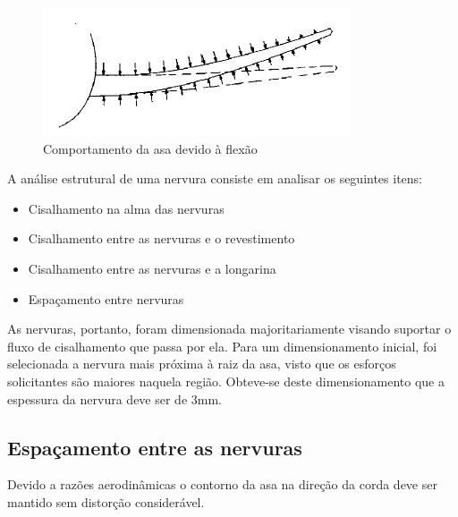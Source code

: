 \begin{figure}
\centering
\includegraphics[width=\textwidth]{images/parte4/nervura2}
\caption{Comportamento da asa devido à flexão}
\label{fig:nervura_asa2}
\end{figure}

A análise estrutural de uma nervura consiste em analisar os seguintes itens:
\begin{itemize}
  \item Cisalhamento na alma das nervuras
  \item Cisalhamento entre as nervuras e o revestimento
  \item Cisalhamento entre as nervuras e a longarina
  \item Espaçamento entre nervuras
\end{itemize}

As nervuras, portanto, foram dimensionada majoritariamente visando suportar o fluxo de cisalhamento que passa por ela. Para um dimensionamento inicial, foi selecionada a nervura mais próxima à raiz da asa, visto que os esforços solicitantes são maiores naquela região. Obteve-se deste dimensionamento que a espessura da nervura deve ser de 3mm. 

\subsection{Espaçamento entre as nervuras}
Devido a razões aerodinâmicas o contorno da asa na direção da corda deve ser mantido sem distorção considerável.


